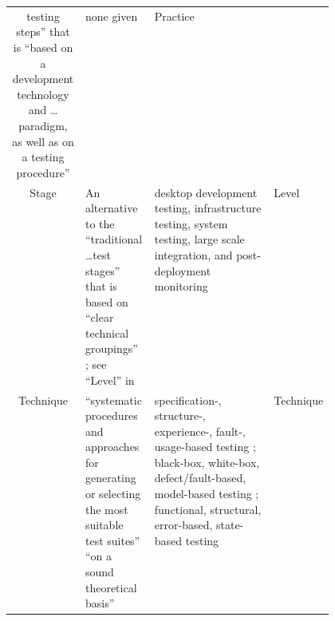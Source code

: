 \begin{table}[hbtp!]
\begin{tabularx}{\linewidth}{|c|X|m{0.37\linewidth}|m{0.1\linewidth}|}
        testing steps'' \cite[p.~2]{BarbosaEtAl2006} that
        is ``based on a development technology and \dots
        paradigm, as well as on a testing procedure''
        \cite[p.~3]{BarbosaEtAl2006}      & none given         & Practice                               \\
        Stage                             & An
        alternative to the ``traditional \dots test stages'' that is based on
        ``clear technical groupings'' \citep[p.~13]{Gerrard2000}; see ``Level'' in
        \nameref{tab:ieeeTestTerms}       & desktop
        development testing, infrastructure testing, system testing,
        large scale integration, and post-deployment monitoring
        \citep[p.~13]{Gerrard2000}        & Level                                                       \\
        Technique                         & ``systematic
        procedures and approaches for generating or selecting the most suitable test
        suites'' \cite[p.~5-10]{SWEBOK2024} ``on a sound theoretical basis''
        \cite[p.~3]{BarbosaEtAl2006}      & specification-,
        structure-, experience-, fault-, usage-based testing \citep[pp.~5-10, 5-13 to 5-15]{SWEBOK2024};
        black-box, white-box, defect/fault-based, model-based testing \citep[p.~3]{SouzaEtAl2017};
        functional, structural, error-based, state-based testing
        \cite[p.~3]{BarbosaEtAl2006}
                                          & Technique                                                   \\
        \hline
    \end{tabularx}
\end{table}

